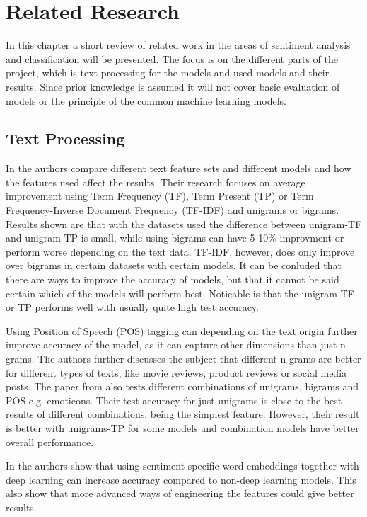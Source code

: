 \chapter{Related Research}
\label{cha:theory}


In this chapter a short review of related work in the areas of sentiment analysis and classification will be presented. 
The focus is on the different parts of the project, which is text processing for the models and used models and their results. 
Since prior knowledge is assumed it will not cover basic evaluation of models or the principle of the common machine learning models. 


\section{Text Processing}
\label{sec:text-processing}


In \cite{gang-wang} the authors compare different text feature sets and different models and how the features used affect the results. 
Their research focuses on average improvement using Term Frequency (TF), Term Present (TP) or Term Frequency-Inverse Document Frequency (TF-IDF) and unigrams or bigrams. 
Results shown are that with the datasets used the difference between unigram-TF and unigram-TP is small, while using bigrams can have 5-10\% improvment or perform worse depending on the text data. 
TF-IDF, however, does only improve over bigrams in certain datasets with certain models. 
It can be conluded that there are ways to improve the accuracy of models, but that it cannot be said certain which of the models will perform best. 
Noticable is that the unigram TF or TP performs well with usually quite high test accuracy. \cite{gang-wang} 


Using Position of Speech (POS) tagging can depending on the text origin further improve accuracy of the model, as it can capture other dimensions than just n-grams. \cite{pak} 
The authors further discusses the subject that different n-grams are better for different types of texts, like movie reviews, product reviews or social media posts. 
The paper from \cite{pang-bo} also tests different combinations of unigrams, bigrams and POS e.g. emoticons. 
Their test accuracy for just unigrams is close to the best results of different combinations, being the simplest feature. 
However, their result is better with unigrams-TP for some models and combination models have better overall performance. 


In \cite{tang} the authors show that using sentiment-specific word embeddings together with deep learning can increase accuracy compared to non-deep learning models. 
This also show that more advanced ways of engineering the features could give better results.


